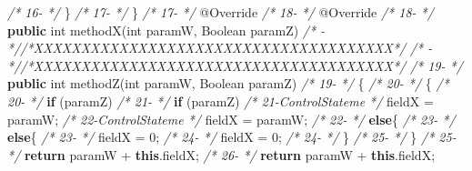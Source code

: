 \documentclass[
]{article}
\newenvironment{Shaded}{\begin{snugshade}}{\end{snugshade}}
\newcommand{\AttributeTok}[1]{\textcolor[rgb]{0.77,0.63,0.00}{#1}}
\newcommand{\BuiltInTok}[1]{#1}
\newcommand{\CommentTok}[1]{\textcolor[rgb]{0.56,0.35,0.01}{\textit{#1}}}
\newcommand{\DataTypeTok}[1]{\textcolor[rgb]{0.13,0.29,0.53}{#1}}
\newcommand{\DecValTok}[1]{\textcolor[rgb]{0.00,0.00,0.81}{#1}}
\newcommand{\FunctionTok}[1]{\textcolor[rgb]{0.00,0.00,0.00}{#1}}
\newcommand{\KeywordTok}[1]{\textcolor[rgb]{0.13,0.29,0.53}{\textbf{#1}}}
\newcommand{\NormalTok}[1]{#1}
\begin{document}
\begin{landscape}
\begin{Shaded}
\begin{Highlighting}[]
\CommentTok{/* 16-                 */}\NormalTok{    \}                                                          }\CommentTok{/* 17-                 */}\NormalTok{    \}                                                          }
\CommentTok{/* 17-                 */}    \AttributeTok{@Override}                                                  \CommentTok{/* 18-                 */}    \AttributeTok{@Override}                                                  
\CommentTok{/* 18-                 */}    \KeywordTok{public} \DataTypeTok{int} \FunctionTok{methodX}\NormalTok{(}\DataTypeTok{int}\NormalTok{ paramW, }\BuiltInTok{Boolean}\NormalTok{ paramZ)             }\CommentTok{/*   -                 *//*XXXXXXXXXXXXXXXXXXXXXXXXXXXXXXXXXXXXXX*/}                     
\CommentTok{/*   -                 *//*XXXXXXXXXXXXXXXXXXXXXXXXXXXXXXXXXXXXXX*/}                     \CommentTok{/* 19-                 */}    \KeywordTok{public} \DataTypeTok{int} \FunctionTok{methodZ}\NormalTok{(}\DataTypeTok{int}\NormalTok{ paramW, }\BuiltInTok{Boolean}\NormalTok{ paramZ)             }
\CommentTok{/* 19-                 */}\NormalTok{    \{                                                          }\CommentTok{/* 20-                 */}\NormalTok{    \{                                                          }
\CommentTok{/* 20-                 */}        \KeywordTok{if}\NormalTok{ (paramZ)                                            }\CommentTok{/* 21-                 */}        \KeywordTok{if}\NormalTok{ (paramZ)                                            }
\CommentTok{/* 21-ControlStateme   */}\NormalTok{            fieldX = paramW;                                   }\CommentTok{/* 22-ControlStateme   */}\NormalTok{            fieldX = paramW;                                   }
\CommentTok{/* 22-                 */}        \KeywordTok{else}\NormalTok{\{                                                  }\CommentTok{/* 23-                 */}        \KeywordTok{else}\NormalTok{\{                                                  }
\CommentTok{/* 23-                 */}\NormalTok{            fieldX = }\DecValTok{0}\NormalTok{;                                        }\CommentTok{/* 24-                 */}\NormalTok{            fieldX = }\DecValTok{0}\NormalTok{;                                        }
\CommentTok{/* 24-                 */}\NormalTok{        \}                                                      }\CommentTok{/* 25-                 */}\NormalTok{        \}                                                      }
\CommentTok{/* 25-                 */}        \KeywordTok{return}\NormalTok{ paramW + }\KeywordTok{this}\NormalTok{.}\FunctionTok{fieldX}\NormalTok{;                           }\CommentTok{/* 26-                 */}        \KeywordTok{return}\NormalTok{ paramW + }\KeywordTok{this}\NormalTok{.}\FunctionTok{fieldX}\NormalTok{;                           }

\end{Highlighting}
\end{Shaded}
\end{landscape}
\end{document}
